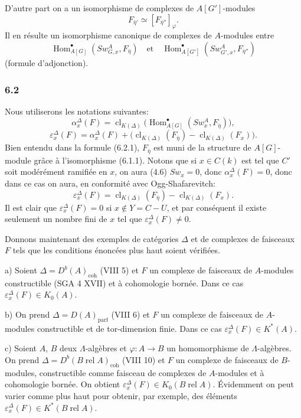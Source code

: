 \documentclass[11pt]{article}
\DeclareMathOperator{\Hom}{Hom}
\providecommand{\parf}{\mathrm{parf}}
\providecommand{\coh}{\mathrm{coh}}
\providecommand{\Hom}{\operatorname{Hom}}
\providecommand{\parf}{\mathrm{parf}}
\providecommand{\coh}{\mathrm{coh}}
\providecommand{\clK}[1]{\operatorname{cl}_{K(#1)}}
\providecommand{\Hom}{\operatorname{Hom}}
\begin{document}
D'autre part on a un isomorphisme de complexes de $A[G']$-modules
\[
F_{\bar\eta'}\simeq [F_{\bar\eta''}]_\varphi.
\]
Il en résulte un isomorphisme canonique de complexes de $A$-modules entre
\[
\Hom^\bullet_{A[G]}(Sw_{G,x}^A,F_{\bar\eta})
\quad\text{et}\quad
\Hom^\bullet_{A[G']}(Sw_{G',x}^A,F_{\bar\eta''})
\]
(formule d'adjonction).

\subsubsection*{6.2}

Nous utiliserons les notations suivantes:
\[
\alpha_x^\Delta(F)
=
\clK{\Delta}\bigl(\Hom^\bullet_{A[G]}(Sw_x^A,F_{\bar\eta})\bigr),
\tag{6.2.1}
\]
\[
\varepsilon_x^\Delta(F)
=
\alpha_x^\Delta(F)+
\bigl(\clK{\Delta}(F_{\bar\eta})-\clK{\Delta}(F_x)\bigr).
\tag{6.2.2}
\]
Bien entendu dans la formule (6.2.1), $F_{\bar\eta}$ est muni de la structure de $A[G]$-module grâce à l'isomorphisme (6.1.1). Notons que si $x\in C(k)$ est tel que $C'$ soit modérément ramifiée en $x$, on aura (4.6) $Sw_x=0$, donc $\alpha_x^\Delta(F)=0$, donc dans ce cas on aura, en conformité avec Ogg-Shafarevitch:
\[
\varepsilon_x^\Delta(F)=\clK{\Delta}(F_{\bar\eta})-\clK{\Delta}(F_x).
\tag{6.2.3}
\]
Il est clair que $\varepsilon_x^\Delta(F)=0$ si $x\notin Y=C-U$, et par conséquent il existe seulement un nombre fini de $x$ tel que $\varepsilon_x^\Delta(F)\ne0$.

Donnons maintenant des exemples de catégories $\Delta$ et de complexes de faisceaux $F$ tels que les conditions énoncées plus haut soient vérifiées.

a) Soient $\Delta=D^b(A)_{\coh}$ (VIII 5) et $F$ un complexe de faisceaux de $A$-modules constructible (SGA 4 XVII) et à cohomologie bornée. Dans ce cas $\varepsilon_x^\Delta(F)\in K_0(A)$.

b) On prend $\Delta=D(A)_{\parf}$ (VIII 6) et $F$ un complexe de faisceaux de $A$-modules constructible et de tor-dimension finie. Dans ce cas $\varepsilon_x^\Delta(F)\in K^*(A)$.

c) Soient $A$, $B$ deux $\Lambda$-algèbres et $\varphi:A\to B$ un homomorphisme de $\Lambda$-algèbres. On prend $\Delta=D^b(B\operatorname{ rel }A)_{\coh}$ (VIII 10) et $F$ un complexe de faisceaux de $B$-modules, constructible comme faisceau de complexes de $A$-modules et à cohomologie bornée. On obtient $\varepsilon_x^\Delta(F)\in K_0(B\operatorname{ rel }A)$. Évidemment on peut varier comme plus haut pour obtenir, par exemple, des éléments $\varepsilon_x^\Delta(F)\in K^*(B\operatorname{ rel }A)$.
\end{document}
